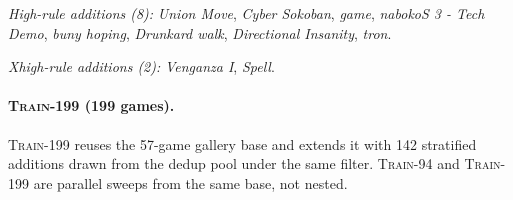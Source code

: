 \textit{High-rule additions (8):}
{\small
\textit{Union Move}, \textit{Cyber Sokoban}, \textit{game},
\textit{nabokoS 3 - Tech Demo}, \textit{buny hoping},
\textit{Drunkard walk}, \textit{Directional Insanity}, \textit{tron}.
}

\textit{Xhigh-rule additions (2):}
{\small
\textit{Venganza I}, \textit{Spell}.
}

\paragraph{\textsc{Train-199} (199 games).}
\textsc{Train-199} reuses the 57-game gallery base and extends it
with 142 stratified additions drawn from the dedup pool under the
same filter. \textsc{Train-94} and \textsc{Train-199} are parallel
sweeps from the same base, not nested.

